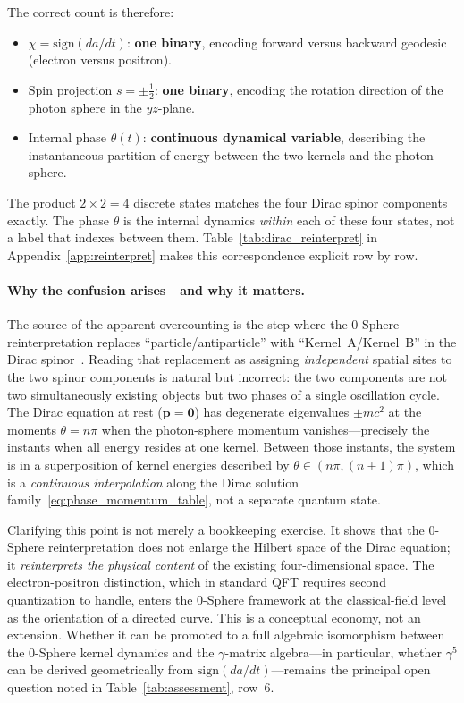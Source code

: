 \documentclass[%
 reprint, amsmath,amssymb, aps, prb, ]{revtex4-2}
\numberwithin{equation}{section}
\newcommand{\iphase}{\theta}
\begin{document}
The correct count is therefore:
\begin{itemize}
\item $\chi = \mathrm{sign}(da/dt)$: \textbf{one binary}, encoding forward versus backward geodesic (electron versus positron).
\item Spin projection $s = \pm\tfrac{1}{2}$: \textbf{one binary}, encoding the rotation direction of the photon sphere in the $yz$-plane.
\item Internal phase $\iphase(t)$: \textbf{continuous dynamical variable}, describing the instantaneous partition of energy between the two kernels and the photon sphere.
\end{itemize}
The product $2 \times 2 = 4$ discrete states matches the four Dirac spinor components exactly. The phase $\iphase$ is the internal dynamics \emph{within} each of these four states, not a label that indexes between them. Table~\ref{tab:dirac_reinterpret} in Appendix~\ref{app:reinterpret} makes this correspondence explicit row by row.

\paragraph{Why the confusion arises---and why it matters.}
The source of the apparent overcounting is the step where the 0-Sphere reinterpretation replaces ``particle/antiparticle'' with ``Kernel~A/Kernel~B'' in the Dirac spinor~\cite{hanamura07}. Reading that replacement as assigning \emph{independent} spatial sites to the two spinor components is natural but incorrect: the two components are not two simultaneously existing objects but two phases of a single oscillation cycle. The Dirac equation at rest ($\mathbf{p} = \mathbf{0}$) has degenerate eigenvalues $\pm mc^2$ at the moments $\iphase = n\pi$ when the photon-sphere momentum vanishes---precisely the instants when all energy resides at one kernel. Between those instants, the system is in a superposition of kernel energies described by $\iphase \in (n\pi, (n+1)\pi)$, which is a \emph{continuous interpolation} along the Dirac solution family~\eqref{eq:phase_momentum_table}, not a separate quantum state.

Clarifying this point is not merely a bookkeeping exercise. It shows that the 0-Sphere reinterpretation does not enlarge the Hilbert space of the Dirac equation; it \emph{reinterprets the physical content} of the existing four-dimensional space. The electron-positron distinction, which in standard QFT requires second quantization to handle, enters the 0-Sphere framework at the classical-field level as the orientation of a directed curve. This is a conceptual economy, not an extension. Whether it can be promoted to a full algebraic isomorphism between the 0-Sphere kernel dynamics and the $\gamma$-matrix algebra---in particular, whether $\gamma^5$ can be derived geometrically from $\mathrm{sign}(da/dt)$---remains the principal open question noted in Table~\ref{tab:assessment}, row~6.
\end{document}
